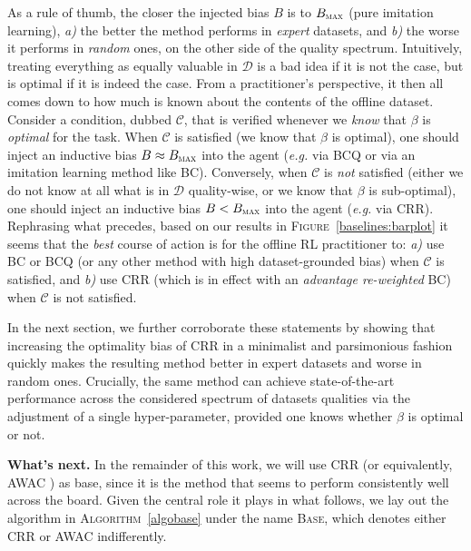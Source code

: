 As a rule of thumb, the closer the injected bias $B$ is to $B_\textsc{max}$ (pure imitation learning),
\textit{a)} the better the method performs in \emph{expert} datasets, and
\textit{b)} the worse it performs in \emph{random} ones, on the other side of the quality spectrum.
Intuitively, treating everything as equally valuable in $\mathcal{D}$
is a bad idea if it is not the case, but is optimal if it is indeed the case.
From a practitioner's perspective, it then all comes down to how much is known about the contents of
the offline dataset.
Consider a condition, dubbed $\mathcal{C}$, that is verified whenever we \emph{know} that $\beta$ is \emph{optimal}
for the task.
When $\mathcal{C}$ is satisfied (we know that $\beta$ is optimal),
one should inject an inductive bias $B \approx B_\textsc{max}$ into the agent
(\textit{e.g.} via BCQ
or via an imitation learning method like BC).
Conversely, when $\mathcal{C}$ is \emph{not} satisfied (either we do not know at all what is in $\mathcal{D}$
quality-wise, or we know that $\beta$ is sub-optimal),
one should inject an inductive bias $B < B_\textsc{max}$ into the agent
(\textit{e.g.} via CRR).
Rephrasing what precedes, based on our results in \textsc{Figure}~\ref{baselines:barplot} it seems that the
\emph{best} course of action is for the offline RL practitioner to:
\textit{a)} use BC or BCQ (or any other method with high dataset-grounded bias)
when $\mathcal{C}$ is satisfied, and
\textit{b)} use CRR (which is in effect with an \emph{advantage re-weighted} BC)
when $\mathcal{C}$ is not satisfied.

In the next section, we further corroborate these statements by showing that increasing the optimality bias of
CRR
in a minimalist and parsimonious fashion quickly makes the resulting method better in expert datasets and
worse in random ones.
Crucially, the same method can achieve state-of-the-art performance across the considered spectrum
of datasets qualities via the adjustment of a single hyper-parameter, provided one knows whether
$\beta$ is optimal or not.

\textbf{What's next.}
In the remainder of this work,
we will use CRR \cite{Wang2020-sr} (or equivalently, AWAC \cite{Nair2020-gd})
as base,
since it is the method that seems to perform consistently well across the board.
Given the central role it plays in what follows,
we lay out the algorithm
in \textsc{Algorithm}~\ref{algobase}
under the name \textsc{Base}, which denotes either CRR or AWAC indifferently.

